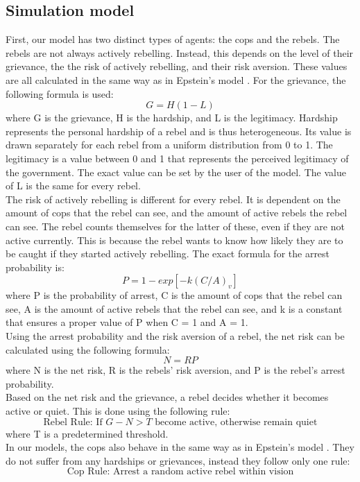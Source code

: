\documentclass[a4paper,11pt]{article}
\begin{document}
\subsection{Simulation model}

First, our model has two distinct types of agents: the cops and the rebels. The rebels are not always actively rebelling. Instead, this depends on the level of their grievance, the the risk of actively rebelling, and their risk aversion. These values are all calculated in the same way as in Epstein's model \cite{epstein2002modeling}. For the grievance, the following formula is used:
\[ G = H(1-L) \]
where G is the grievance, H is the hardship, and L is the legitimacy. Hardship represents the personal hardship of a rebel and is thus heterogeneous. Its value is drawn separately for each rebel from a uniform distribution from 0 to 1. The legitimacy is a value between 0 and 1 that represents the perceived legitimacy of the government. The exact value can be set by the user of the model. The value of L is the same for every rebel.\\
The risk of actively rebelling is different for every rebel. It is dependent on the amount of cops that the rebel can see, and the amount of active rebels the rebel can see. The rebel counts themselves for the latter of these, even if they are not active currently. This is because the rebel wants to know how likely they are to be caught if they started actively rebelling. The exact formula for the arrest probability is:
\[ P = 1 - exp[-k(C/A)_v] \]
where P is the probability of arrest, C is the amount of cops that the rebel can see, A is the amount of active rebels that the rebel can see, and k is a constant that ensures a proper value of P when C = 1 and A = 1.\\
Using the arrest probability and the risk aversion of a rebel, the net risk can be calculated using the following formula:
\[N = RP\]
where N is the net risk, R is the rebels' risk aversion, and P is the rebel's arrest probability.\\
Based on the net risk and the grievance, a rebel decides whether it becomes active or quiet. This is done using the following rule:
\[\text{Rebel Rule: If } G - N > T \text{ become active, otherwise remain quiet}\]
where T is a predetermined threshold.\\
In our models, the cops also behave in the same way as in Epstein's model \cite{epstein2002modeling}. They do not suffer from any hardships or grievances, instead they follow only one rule:
\[\text{Cop Rule: Arrest a random active rebel within vision}\]
\end{document}
